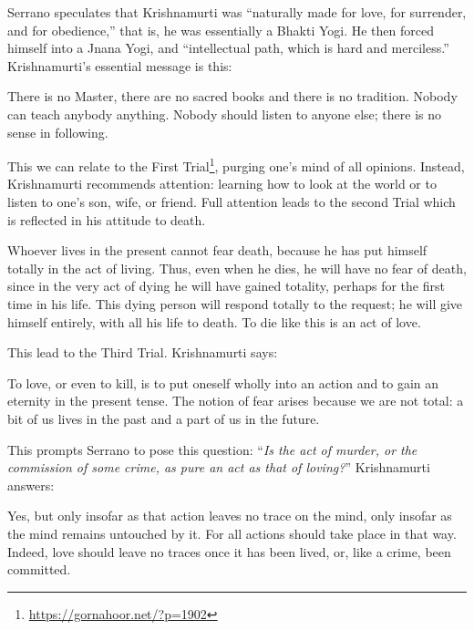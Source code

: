 Serrano speculates that Krishnamurti was ``naturally made for love, for surrender, and for obedience,'' that is, he was essentially a Bhakti Yogi. He then forced himself into a Jnana Yogi, and ``intellectual path, which is hard and merciless.'' Krishnamurti's essential message is this:

\begin{quotex}
There is no Master, there are no sacred books and there is no tradition. Nobody can teach anybody anything. Nobody should listen to anyone else; there is no sense in following.
\end{quotex}


This we can relate to the First Trial\footnote{\url{https://gornahoor.net/?p=1902}}, purging one's mind of all opinions. Instead, Krishnamurti recommends attention: learning how to look at the world or to listen to one's son, wife, or friend. Full attention leads to the second Trial which is reflected in his attitude to death.

\begin{quotex}
Whoever lives in the present cannot fear death, because he has put himself totally in the act of living. Thus, even when he dies, he will have no fear of death, since in the very act of dying he will have gained totality, perhaps for the first time in his life. This dying person will respond totally to the request; he will give himself entirely, with all his life to death. To die like this is an act of love.
\end{quotex}


This lead to the Third Trial. Krishnamurti says:

\begin{quotex}
To love, or even to kill, is to put oneself wholly into an action and to gain an eternity in the present tense. The notion of fear arises because we are not total: a bit of us lives in the past and a part of us in the future.
\end{quotex}


This prompts Serrano to pose this question: ``\emph{Is the act of murder, or the commission of some crime, as pure an act as that of loving?}'' Krishnamurti answers:

\begin{quotex}
Yes, but only insofar as that action leaves no trace on the mind, only insofar as the mind remains untouched by it. For all actions should take place in that way. Indeed, love should leave no traces once it has been lived, or, like a crime, been committed.
\end{quotex}


